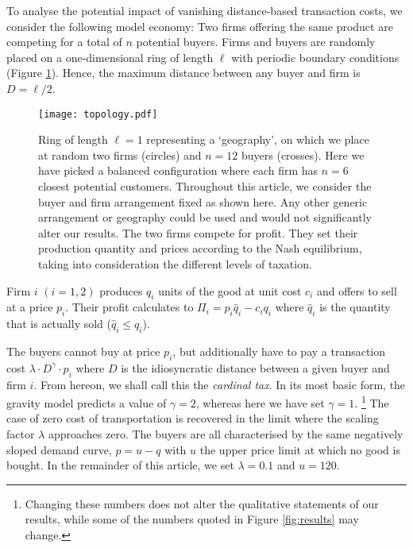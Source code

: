 \documentclass[final,5p,times,twocolumn,11pt,authoryear]{elsarticle}
\numberwithin{equation}{section} %
\begin{document}
To analyse the potential impact of vanishing distance-based transaction costs, we consider the following model economy: 
Two firms offering the same product are competing for a total of $n$ potential buyers. 
Firms and buyers are randomly placed on a one-dimensional ring of length $\ell$ with periodic boundary conditions (Figure \ref{fig:topology}). 
Hence, the maximum distance between any buyer and firm is $D=\ell/2$. 

\begin{figure}[!htb]
	\centering
	\texttt{[image: topology.pdf]}
	\caption{	Ring of length $\ell=1$ representing a `geography', on which we place at random two firms (circles) and $n=12$ buyers (crosses). 
			Here we have picked a balanced configuration where each firm has $n=6$ closest potential customers. 
			Throughout this article, we consider the buyer and firm arrangement fixed as shown here. 
			Any other generic arrangement or geography could be used and would not significantly alter our results.
			The two firms compete for profit.
			They set their production quantity and prices according to the Nash equilibrium, 
			taking into consideration the different levels of taxation. 
			}
	\label{fig:topology}
\end{figure}


Firm $i$ $(i=1,2)$ produces $q_i$ units of the good at unit cost $c_i$ and offers to sell at a price $p_i$. 
Their profit calculates to $\Pi_i = p_i \hat{q}_i - c_i q_i$ where $\hat{q}_i$ is the quantity that is actually sold ($\hat{q}_i \leqslant q_i$). 

The buyers cannot buy at price $p_i$, but additionally have to pay a transaction cost $\lambda \cdot D^\gamma \cdot p_i$ where $D$ is the idiosyncratic distance between a given buyer and firm $i$. 
From hereon, we shall call this the \textit{cardinal tax}. 
In its most basic form, the gravity model predicts a value of $\gamma=2$, whereas here we have set $\gamma=1$.  
\footnote{
\label{ftn:wlog}
Changing these numbers does not alter the qualitative statements of our results, 
while some of the numbers quoted in Figure \ref{fig:results} may change.
} 
The case of zero cost of transportation is recovered in the limit where the scaling factor $\lambda$ approaches zero. 
The buyers are all characterised by the same negatively sloped demand curve, $p = u - q$ with $u$ the upper price limit at which no good is bought.
In the remainder of this article, we set $\lambda = 0.1$ and $u = 120$. 
\end{document}
